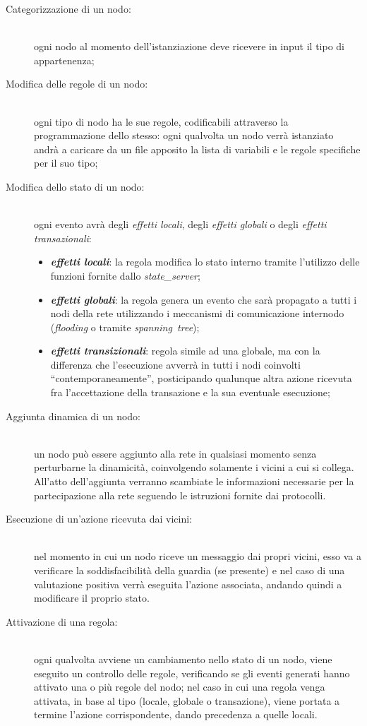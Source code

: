 \documentclass[italian]{memoir}
\begin{document}
\begin{description}
\item[Categorizzazione di un nodo:]~\\ ogni nodo al momento dell'istanziazione deve ricevere in input il tipo di appartenenza;
\item[Modifica delle regole di un nodo:]~\\ ogni tipo di nodo ha le sue regole, codificabili attraverso la programmazione dello stesso: ogni qualvolta un nodo verrà istanziato andrà a caricare da un file apposito la lista di variabili e le regole specifiche per il suo tipo;
\item[Modifica dello stato di un nodo:]~\\ ogni evento avrà degli \textit{effetti locali}, degli \textit{effetti globali} o degli \textit{effetti transazionali}:
	\begin{itemize}
	\item \textit{\textbf{effetti locali}}: la regola modifica lo stato interno tramite l'utilizzo delle funzioni fornite dallo \textit{state\_server};
	\item \textit{\textbf{effetti globali}}: la regola genera un evento che sarà propagato a tutti i nodi della rete utilizzando i meccanismi di comunicazione internodo (\textit{flooding} o tramite \textit{spanning~tree});
	\item \textit{\textbf{effetti transizionali}}: regola simile ad una globale, ma con la differenza che l'esecuzione avverrà in tutti i nodi coinvolti ``contemporaneamente'', posticipando qualunque altra azione ricevuta fra l'accettazione della transazione e la sua eventuale esecuzione;
	\end{itemize}
\item[Aggiunta dinamica di un nodo:]~\\ un nodo può essere aggiunto alla rete in qualsiasi momento senza perturbarne la dinamicità, coinvolgendo solamente i vicini a cui si collega. All'atto dell'aggiunta verranno scambiate le informazioni necessarie per la partecipazione alla rete seguendo le istruzioni fornite dai protocolli.
\item[Esecuzione di un'azione ricevuta dai vicini:]~\\ nel momento in cui un nodo riceve un messaggio dai propri vicini, esso va a verificare la soddisfacibilità della guardia (se presente) e nel caso di una valutazione positiva verrà eseguita l'azione associata, andando quindi a modificare il proprio stato.
\item[Attivazione di una regola:]~\\ ogni qualvolta avviene un cambiamento nello stato di un nodo, viene eseguito un controllo delle regole, verificando se gli eventi generati hanno attivato una o più regole del nodo; nel caso in cui una regola venga attivata, in base al tipo (locale, globale o transazione), viene portata a termine l'azione corrispondente, dando precedenza a quelle locali.
\end{description}
\end{document}
